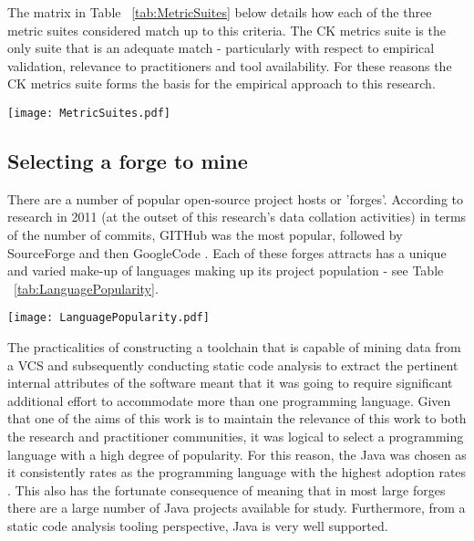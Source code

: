 The matrix in Table ~\ref{tab:MetricSuites} below details how each of the three metric suites considered match up to this criteria. The CK metrics suite is the only suite that is an adequate match - particularly with respect to empirical validation, relevance to practitioners and tool availability. For these reasons the CK metrics suite forms the basis for the empirical approach to this research. 

\begin{table}
\centering 
{}
\begin{tabular}
 \centering 
 \texttt{[image: MetricSuites.pdf]}
 \label{tab:MetricSuites}
\end{tabular}
\end{table}

\subsection{Selecting a forge to mine}
There are a number of popular open-source project hosts or 'forges'. According to research in 2011 (at the outset of this research's data collation activities) in terms of the number of commits, GITHub was the most popular, followed by SourceForge and then GoogleCode \citep{grady2011what}. Each of these forges attracts has a unique and varied make-up of languages making up its project population - see Table ~\ref{tab:LanguagePopularity}.

\begin{table}
\centering 
{}
\begin{tabular}
 \centering 
 \texttt{[image: LanguagePopularity.pdf]}
 \label{tab:LanguagePopularity}
\end{tabular}
\end{table}

The practicalities of constructing a toolchain that is capable of mining data from a VCS and subsequently conducting static code analysis to extract the pertinent internal attributes of the software meant that it was going to require significant additional effort to accommodate more than one programming language. Given that one of the aims of this work is to maintain the relevance of this work to both the research and practitioner communities, it was logical to select a programming language with a high degree of popularity. For this reason, the Java was chosen as it consistently rates as the programming language with the highest adoption rates \citep{tiobe2017}. This also has the fortunate consequence of meaning that in most large forges there are a large number of Java projects available for study.  Furthermore, from a static code analysis tooling perspective, Java is very well supported.

